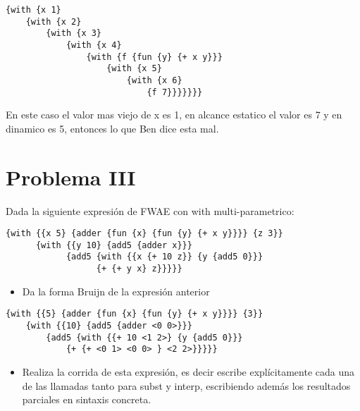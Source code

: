 \documentclass[letterpaper,11pt]{article}
\begin{document}
\begin{verbatim}
{with {x 1}
    {with {x 2}
        {with {x 3}
            {with {x 4}
                {with {f {fun {y} {+ x y}}}
                    {with {x 5}
                        {with {x 6}
                            {f 7}}}}}}}
\end{verbatim}

En este caso el valor mas viejo de x es 1, en alcance estatico el valor es 7 y en dinamico es 5, entonces lo que Ben dice esta mal.

\section{Problema III}
Dada la siguiente expresión de FWAE con with multi-parametrico:

\begin{verbatim}
{with {{x 5} {adder {fun {x} {fun {y} {+ x y}}}} {z 3}}
      {with {{y 10} {add5 {adder x}}}
            {add5 {with {{x {+ 10 z}} {y {add5 0}}}
                  {+ {+ y x} z}}}}}
\end{verbatim}

\begin{itemize}
\item Da la forma Bruijn de la expresión anterior
\end{itemize}

\begin{verbatim}
{with {{5} {adder {fun {x} {fun {y} {+ x y}}}} {3}}
    {with {{10} {add5 {adder <0 0>}}}
        {add5 {with {{+ 10 <1 2>} {y {add5 0}}}
            {+ {+ <0 1> <0 0> } <2 2>}}}}}
\end{verbatim}

\begin{itemize}
\item Realiza la corrida de esta expresión, es decir escribe explícitamente cada una de las llamadas tanto para subst y interp, escribiendo además los resultados parciales en sintaxis concreta.
\end{itemize}
\end{document}

